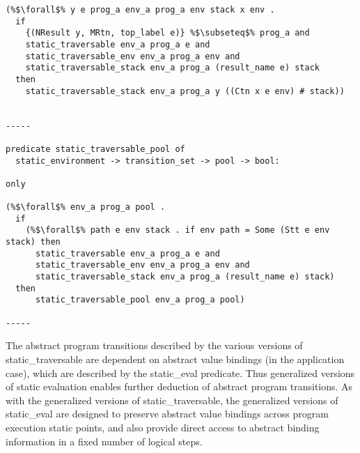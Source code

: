 \documentclass{article}
\begin{document}
\begin{lstlisting}[language=logic, style=codestyle1, escapechar=\%]
(%$\forall$% y e prog_a env_a prog_a env stack x env .
  if 
    {(NResult y, MRtn, top_label e)} %$\subseteq$% prog_a and
    static_traversable env_a prog_a e and
    static_traversable_env env_a prog_a env and
    static_traversable_stack env_a prog_a (result_name e) stack 
  then 
    static_traversable_stack env_a prog_a y ((Ctn x e env) # stack))


-----

predicate static_traversable_pool of
  static_environment -> transition_set -> pool -> bool:

only

(%$\forall$% env_a prog_a pool .
  if
    (%$\forall$% path e env stack . if env path = Some (Stt e env stack) then 
      static_traversable env_a prog_a e and 
      static_traversable_env env_a prog_a env and 
      static_traversable_stack env_a prog_a (result_name e) stack) 
  then
      static_traversable_pool env_a prog_a pool)

-----

\end{lstlisting}

The abstract program transitions described by the various versions of static\_traversable are
dependent on abstract value bindings (in the application case), which are described by the
static\_eval predicate.  Thus generalized versions of static evaluation enables further
deduction of abstract program transitions.  As with the generalized versions of
static\_traversable, the generalized versions of static\_eval are designed to preserve abstract
value bindings across program execution static points, and also provide direct access to abstract
binding information in a fixed number of logical steps. 
\end{document}
